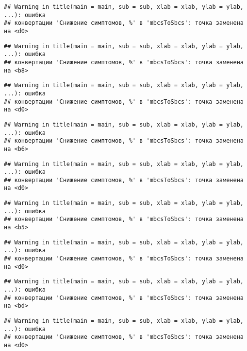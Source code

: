 \documentclass[
]{article}
\begin{document}
\begin{verbatim}
## Warning in title(main = main, sub = sub, xlab = xlab, ylab = ylab, ...): ошибка
## конвертации 'Снижение симптомов, %' в 'mbcsToSbcs': точка заменена на <d0>
\end{verbatim}

\begin{verbatim}
## Warning in title(main = main, sub = sub, xlab = xlab, ylab = ylab, ...): ошибка
## конвертации 'Снижение симптомов, %' в 'mbcsToSbcs': точка заменена на <b8>
\end{verbatim}

\begin{verbatim}
## Warning in title(main = main, sub = sub, xlab = xlab, ylab = ylab, ...): ошибка
## конвертации 'Снижение симптомов, %' в 'mbcsToSbcs': точка заменена на <d0>
\end{verbatim}

\begin{verbatim}
## Warning in title(main = main, sub = sub, xlab = xlab, ylab = ylab, ...): ошибка
## конвертации 'Снижение симптомов, %' в 'mbcsToSbcs': точка заменена на <b6>
\end{verbatim}

\begin{verbatim}
## Warning in title(main = main, sub = sub, xlab = xlab, ylab = ylab, ...): ошибка
## конвертации 'Снижение симптомов, %' в 'mbcsToSbcs': точка заменена на <d0>
\end{verbatim}

\begin{verbatim}
## Warning in title(main = main, sub = sub, xlab = xlab, ylab = ylab, ...): ошибка
## конвертации 'Снижение симптомов, %' в 'mbcsToSbcs': точка заменена на <b5>
\end{verbatim}

\begin{verbatim}
## Warning in title(main = main, sub = sub, xlab = xlab, ylab = ylab, ...): ошибка
## конвертации 'Снижение симптомов, %' в 'mbcsToSbcs': точка заменена на <d0>
\end{verbatim}

\begin{verbatim}
## Warning in title(main = main, sub = sub, xlab = xlab, ylab = ylab, ...): ошибка
## конвертации 'Снижение симптомов, %' в 'mbcsToSbcs': точка заменена на <bd>
\end{verbatim}

\begin{verbatim}
## Warning in title(main = main, sub = sub, xlab = xlab, ylab = ylab, ...): ошибка
## конвертации 'Снижение симптомов, %' в 'mbcsToSbcs': точка заменена на <d0>
\end{verbatim}
\end{document}
